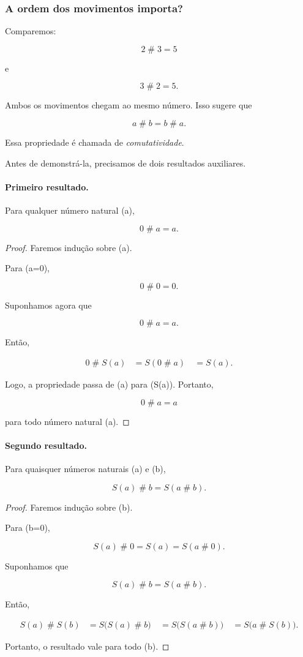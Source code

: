 \documentclass[12pt,a4paper]{article}
\newcommand{\mov}{\mathbin{\#}}
\begin{document}
\subsubsection{A ordem dos movimentos importa?}

Comparemos:

\[
2\mov3=5
\]

e

\[
3\mov2=5.
\]

Ambos os movimentos chegam ao mesmo número. Isso sugere que

\[
a\mov b=b\mov a.
\]

Essa propriedade é chamada de \emph{comutatividade}.

Antes de demonstrá-la, precisamos de dois resultados auxiliares.

\paragraph{Primeiro resultado.}

Para qualquer número natural (a),

\[
0\mov a=a.
\]

\begin{proof}
Faremos indução sobre (a).

Para (a=0),

\[
0\mov0=0.
\]

Suponhamos agora que

\[
0\mov a=a.
\]

Então,

\[
\begin{aligned}
0\mov S(a)
&=S(0\mov a)\
&=S(a).
\end{aligned}
\]

Logo, a propriedade passa de (a) para (S(a)). Portanto,

\[
0\mov a=a
\]

para todo número natural (a).
\end{proof}

\paragraph{Segundo resultado.}

Para quaisquer números naturais (a) e (b),

\[
S(a)\mov b=S(a\mov b).
\]

\begin{proof}
Faremos indução sobre (b).

Para (b=0),

\[
S(a)\mov0=S(a)=S(a\mov0).
\]

Suponhamos que

\[
S(a)\mov b=S(a\mov b).
\]

Então,

\[
\begin{aligned}
S(a)\mov S(b)
&=S\bigl(S(a)\mov b\bigr)\
&=S\bigl(S(a\mov b)\bigr)\
&=S\bigl(a\mov S(b)\bigr).
\end{aligned}
\]

Portanto, o resultado vale para todo (b).
\end{proof}
\end{document}
